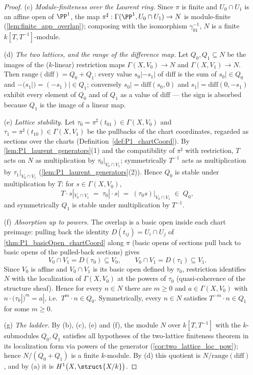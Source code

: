 \begin{proof}
  (c) \emph{Module-finiteness over the Laurent ring.} Since \(\pi\) is finite and
  \(U_0 \cap U_1\) is an affine open of \(\PP^1\), the map
  \(\pi^\sharp : \Gamma(\PP^1, U_0 \cap U_1) \to N\) is module-finite
  (\ref{lem:finite_app_overlap}); composing with the isomorphism \(\gamma_{01}^{-1}\),
  \(N\) is a finite \(k[T,T^{-1}]\)-module.

  (d) \emph{The two lattices, and the range of the difference map.} Let
  \(Q_0, Q_1 \subseteq N\) be the images of the (\(k\)-linear) restriction maps
  \(\Gamma(X, V_0) \to N\) and \(\Gamma(X, V_1) \to N\). Then
  \(\mathrm{range}(\mathrm{diff}) = Q_0 + Q_1\): every value
  \(s_0| - s_1|\) of \(\mathrm{diff}\) is the sum of \(s_0| \in Q_0\) and
  \(-(s_1|) = (-s_1)| \in Q_1\); conversely \(s_0| = \mathrm{diff}(s_0, 0) \) and
  \(s_1| = \mathrm{diff}(0, -s_1)\) exhibit every element of \(Q_0\) and of \(Q_1\) as a
  value of \(\mathrm{diff}\) --- the sign is absorbed because \(Q_1\) is the image of a
  linear map.

  (e) \emph{Lattice stability.} Let
  \(\tau_0 = \pi^\sharp(t_{01}) \in \Gamma(X, V_0)\) and
  \(\tau_1 = \pi^\sharp(t_{10}) \in \Gamma(X, V_1)\) be the pullbacks of the chart
  coordinates, regarded as sections over the charts
  (Definition~\ref{def:P1_chartCoord}). By \ref{lem:P1_laurent_generators}(1) and the
  compatibility of \(\pi^\sharp\) with restriction, \(T\) acts on \(N\) as
  multiplication by \(\tau_0|_{V_0 \cap V_1}\); symmetrically \(T^{-1}\) acts as
  multiplication by \(\tau_1|_{V_0 \cap V_1}\) (\ref{lem:P1_laurent_generators}(2)).
  Hence \(Q_0\) is stable under multiplication by \(T\): for \(s \in \Gamma(X, V_0)\),
  \[
    T \cdot s|_{V_0 \cap V_1} \;=\; \tau_0|\cdot s| \;=\; (\tau_0 s)|_{V_0 \cap V_1}
      \;\in\; Q_0,
  \]
  and symmetrically \(Q_1\) is stable under multiplication by \(T^{-1}\).

  (f) \emph{Absorption up to powers.} The overlap is a basic open inside each chart
  preimage: pulling back the identity \(D(t_{ij}) = U_i \cap U_j\) of
  \ref{thm:P1_basicOpen_chartCoord} along \(\pi\) (basic opens of sections pull back to
  basic opens of the pulled-back sections) gives
  \[
    V_0 \cap V_1 = D(\tau_0) \subseteq V_0,
    \qquad
    V_0 \cap V_1 = D(\tau_1) \subseteq V_1 .
  \]
  Since \(V_0\) is affine and \(V_0 \cap V_1\) is its basic open defined by \(\tau_0\),
  restriction identifies \(N\) with the localization of \(\Gamma(X, V_0)\) at the powers
  of \(\tau_0\) (quasi-coherence of the structure sheaf). Hence for every \(n \in N\)
  there are \(m \ge 0\) and \(a \in \Gamma(X, V_0)\) with
  \(n \cdot (\tau_0|)^m = a|\), i.e.\ \(T^m \cdot n \in Q_0\). Symmetrically, every
  \(n \in N\) satisfies \(T^{-m} \cdot n \in Q_1\) for some \(m \ge 0\).

  (g) \emph{The ladder.} By (b), (c), (e) and (f), the module \(N\) over
  \(k[T,T^{-1}]\) with the \(k\)-submodules \(Q_0, Q_1\) satisfies all hypotheses of the
  two-lattice finiteness theorem in its localization form via powers of the generator
  (\ref{cor:two_lattice_loc_pow}); hence \(N/(Q_0 + Q_1)\) is a finite \(k\)-module. By
  (d) this quotient is \(N/\mathrm{range}(\mathrm{diff})\), and by (a) it is
  \(H^1\bigl(X, \struct{X/k}\bigr)\).
\end{proof}

